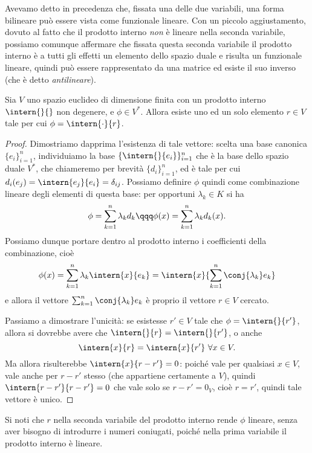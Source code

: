 Avevamo detto in precedenza che, fissata una delle due variabili, una forma bilineare può essere vista come funzionale lineare.
Con un piccolo aggiustamento, dovuto al fatto che il prodotto interno \emph{non} è lineare nella seconda variabile, possiamo comunque affermare che fissata questa seconda variabile il prodotto interno è a tutti gli effetti un elemento dello spazio duale e risulta un funzionale lineare, quindi può essere rappresentato da una matrice ed esiste il suo inverso (che è detto \emph{antilineare}).%
\begin{teorema} \label{t:riesz}
	Sia $V$ uno spazio euclideo di dimensione finita con un prodotto interno $\intern{}{}$ non degenere, e $\phi\in V^*$.
	Allora esiste uno ed un solo elemento $  r\in V$ tale per cui $\phi=\intern{\cdot}{  r}$.
\end{teorema}
\begin{proof}
	Dimostriamo dapprima l'esistenza di tale vettore: scelta una base canonica $\{  e_i\}_{i=1}^n$, individuiamo la base $\{\intern{}{  e_i}\}_{i=1}^n$ che è la base dello spazio duale $V^*$, che chiameremo per brevità $\{d_i\}_{i=1}^n$, ed è tale per cui $d_i(  e_j)=\intern{  e_j}{  e_i}=\delta_{ij}$.
	Possiamo definire $\phi$ quindi come combinazione lineare degli elementi di questa base: per opportuni $\lambda_k\in K$ si ha
	\begin{equation*}
		\phi=\sum_{k=1}^n\lambda_kd_k\qqq \phi(  x)=\sum_{k=1}^n\lambda_kd_k(  x).
	\end{equation*}
	Possiamo dunque portare dentro al prodotto interno i coefficienti della combinazione, cioè
	\begin{equation*}
		\phi(  x)=\sum_{k=1}^n\lambda_k\intern{  x}{  e_k}=\intern{  x}{\sum_{k=1}^n\conj{\lambda_k}  e_k}
	\end{equation*}
	e allora il vettore $\sum_{k=1}^n\conj{\lambda_k}  e_k$ è proprio il vettore $  r\in V$ cercato.
	
	Passiamo a dimostrare l'unicità: se esistesse $  r'\in V$ tale che $\phi=\intern{}{  r'}$, allora si dovrebbe avere che $\intern{}{  r}=\intern{}{  r'}$, o anche
	\begin{equation*}
		\intern{  x}{  r}=\intern{  x}{  r'}\ \forall  x\in V.
	\end{equation*}
	Ma allora risulterebbe $\intern{  x}{  r-  r'}=0$: poiché vale per qualsiasi $  x\in V$, vale anche per $  r-  r'$ stesso (che appartiene certamente a $V$), quindi $\intern{  r-  r'}{  r-  r'}=0$ che vale solo se $  r-  r'=0_V$, cioè $  r=  r'$, quindi tale vettore è unico.
\end{proof}
Si noti che $  r$ nella seconda variabile del prodotto interno rende $\phi$ lineare, senza aver bisogno di introdurre i numeri coniugati, poiché nella prima variabile il prodotto interno è lineare. 

